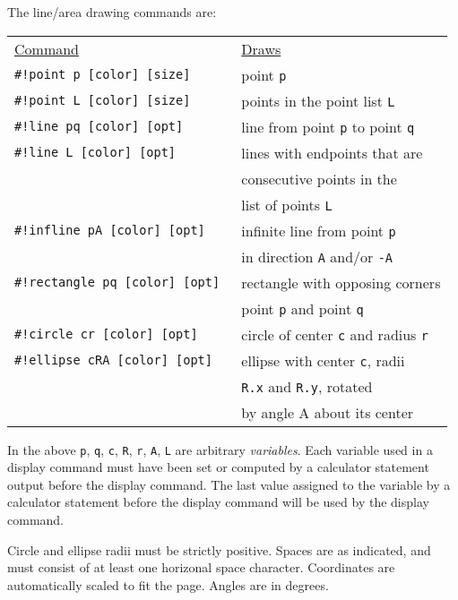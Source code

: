 \documentclass[12pt]{article}
\begin{document}
\begin{minipage}{\textwidth}
The line/area drawing commands are:
\\[1ex]
\begin{tabular}{@{}l@{~~~~~}l@{}}
\underline{Command} & \underline{Draws}
\\[1ex]
\tt \#!point p [color] [size] & point {\tt p} \\
\tt \#!point L [color] [size] & points in the point list {\tt L} \\
\tt \#!line pq [color] [opt] & line from point {\tt p}
                                 to point {\tt q} \\
\tt \#!line L  [color] [opt] & lines with endpoints that are \\
                             & consecutive points in the \\
		             & list of points {\tt L} \\
\tt \#!infline pA [color] [opt] & infinite line from point {\tt p} \\
                                & in direction {\tt A} and/or {\tt -A} \\
\tt \#!rectangle pq [color] [opt] & rectangle with opposing corners \\
                                  & point {\tt p} and point {\tt q} \\
\tt \#!circle cr [color] [opt] & circle of center {\tt c}
                                   and radius {\tt r} \\
\tt \#!ellipse cRA [color] [opt] & ellipse with center {\tt c}, radii \\
                                   & {\tt R.x} and {\tt R.y}, rotated \\
                                   & by angle A about its center \\
\end{tabular}
\end{minipage}

In the above {\tt p}, {\tt q}, {\tt c}, {\tt R}, {\tt r}, {\tt A}, {\tt L}
are arbitrary {\em variables}.  Each variable used in a display command
must have been set or computed by a calculator statement output before
the display command.  The last value assigned to the variable by a
calculator statement before the display command will be used by the
display command.

Circle and ellipse radii must be strictly positive.
Spaces are as indicated, and must consist
of at least one horizonal space character.
Coordinates are automatically scaled to fit the page.  Angles are
in degrees.
\end{document}
